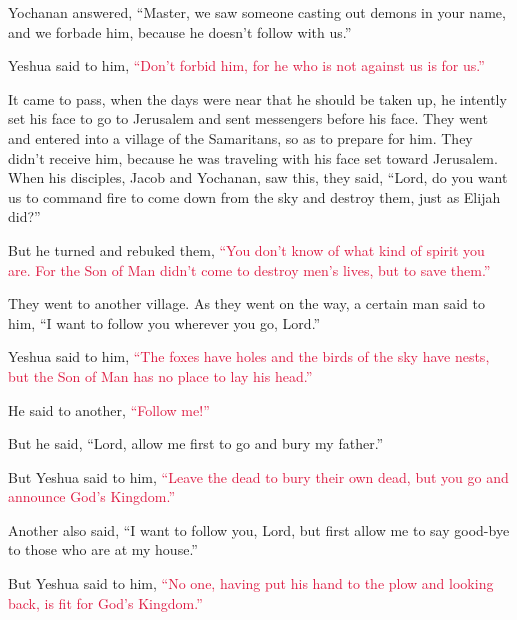 \myverse{}Yochanan answered, “Master, we saw someone casting out demons
in your name, and we forbade him, because he doesn’t follow with us.”

\myverse{}Yeshua said to him,
\textcolor{crimson}{“Don’t forbid him, for he who is not against us is for us.”}

\myverse{}It came to pass, when the days were near that he should be taken
up, he intently set his face to go to Jerusalem
\myverse{}and sent messengers before his face. They went and entered into a village
of the Samaritans, so as to prepare for him.
\myverse{}They didn’t receive him, because he was traveling with his face set toward
Jerusalem.
\myverse{}When his disciples, Jacob and Yochanan, saw this, they said, “Lord, do you
want us to command fire to come down from the sky and destroy them, just as Elijah did?”

\myverse{}But he turned and rebuked them,
\textcolor{crimson}{“You don’t know of what kind of spirit you are.
}
\myverse{}\textcolor{crimson}{For the Son of Man didn’t come to destroy men’s lives, but to save them.”}

They went to another village.
\myverse{}As they went on the way, a certain man said to him, “I want to follow you
wherever you go, Lord.”

\myverse{}Yeshua said to him,
\textcolor{crimson}{“The foxes have holes and the birds of the sky have nests, but the Son of Man has no place to lay
	his head.”}

\myverse{}He said to another,
\textcolor{crimson}{“Follow me!”}

But he said, “Lord, allow me first to go and bury my father.”

\myverse{}But Yeshua said to him,
\textcolor{crimson}{“Leave the dead to bury their own dead, but you go and announce God’s Kingdom.”}

\myverse{}Another also said, “I want to follow you, Lord, but first allow
me to say good-bye to those who are at my house.”

\myverse{}But Yeshua said to him,
\textcolor{crimson}{“No one, having put his hand to the plow and looking back, is fit for God’s Kingdom.”}


